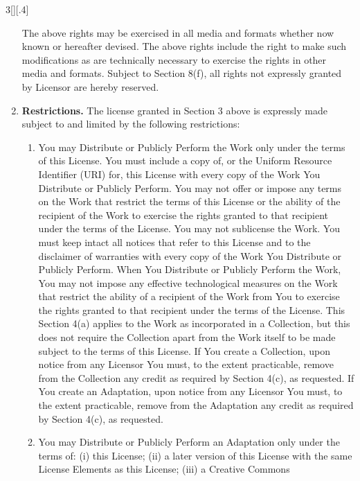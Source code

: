 \documentclass[8pt,a4paper]{article}
\begin{document}
\begin{multicols}{3}[][.4\paperwidth]
\begin{enumerate}
  The above rights may be exercised in all media and formats whether now
  known or hereafter devised. The above rights include the right to make
  such modifications as are technically necessary to exercise the rights in
  other media and formats. Subject to Section 8(f), all rights not expressly
  granted by Licensor are hereby reserved.

 \item \textbf{Restrictions.} The license granted in Section 3 above is
       expressly made subject to and limited by the following restrictions:

  \begin{enumerate}

  \item You may Distribute or Publicly Perform the Work only under the terms
        of this License. You must include a copy of, or the Uniform Resource
        Identifier (URI) for, this License with every copy of the Work You
        Distribute or Publicly Perform. You may not offer or impose any terms
        on the Work that restrict the terms of this License or the ability of
        the recipient of the Work to exercise the rights granted to that
        recipient under the terms of the License. You may not sublicense the
        Work. You must keep intact all notices that refer to this License and
        to the disclaimer of warranties with every copy of the Work You
        Distribute or Publicly Perform. When You Distribute or Publicly
        Perform the Work, You may not impose any effective technological
        measures on the Work that restrict the ability of a recipient of the
        Work from You to exercise the rights granted to that recipient under
        the terms of the License. This Section 4(a) applies to the Work as
        incorporated in a Collection, but this does not require the Collection
        apart from the Work itself to be made subject to the terms of this
        License. If You create a Collection, upon notice from any Licensor You
        must, to the extent practicable, remove from the Collection any credit
        as required by Section 4(c), as requested. If You create an
        Adaptation, upon notice from any Licensor You must, to the extent
        practicable, remove from the Adaptation any credit as required by
        Section 4(c), as requested.
  \item You may Distribute or Publicly Perform an Adaptation only under the
        terms of: (i) this License; (ii) a later version of this License with
        the same License Elements as this License; (iii) a Creative Commons

\end{enumerate}
\end{enumerate}
\end{multicols}
\end{document}
